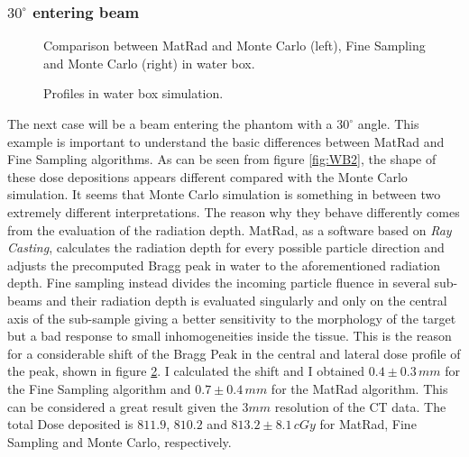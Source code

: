 \documentclass[12pt, a4paper, twoside]{book}
\begin{document}
\subsubsection{$30^\circ$ entering beam}
\begin{figure}[!t]
\centering
{} 
\caption{Comparison between MatRad and Monte Carlo (left), Fine Sampling and Monte Carlo (right) in water box.}
\label{fig:WB2gam}
\end{figure}
\begin{figure}[!b]
\centering
{}\quad
{}\quad
{}\quad
\caption{Profiles in water box simulation.}
\label{fig:WB2prof}
\end{figure}
The next case will be a beam entering the phantom with a $30^\circ$ angle. This example is important to understand the basic differences between MatRad and Fine Sampling algorithms. As can be seen from figure \ref{fig:WB2}, the shape of these dose depositions appears different compared with the Monte Carlo simulation. It seems that Monte Carlo simulation is something in between two extremely different interpretations.
The reason why they behave differently comes from the evaluation of the radiation depth. MatRad, as a software based on \emph{Ray Casting}, calculates the radiation depth for every possible particle direction and adjusts the precomputed Bragg peak in water to the aforementioned radiation depth. Fine sampling instead divides the incoming particle fluence in several sub-beams and their radiation depth is evaluated singularly and only on the central axis of the sub-sample giving a better sensitivity to the morphology of the target but a bad response to small inhomogeneities inside the tissue.
This is the reason for a considerable shift of the Bragg Peak in the central and lateral dose profile of the peak, shown in figure \ref{fig:WB2prof}. I calculated the shift and I obtained $0.4\pm0.3\,mm$ for the Fine Sampling algorithm and $0.7\pm0.4\,mm$ for the MatRad algorithm. This can be considered a great result given the $3mm$ resolution of the CT data.
The total Dose deposited is $811.9$, $810.2$ and $813.2\pm8.1\,cGy$ for MatRad, Fine Sampling and Monte Carlo, respectively.
\end{document}
